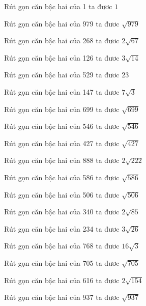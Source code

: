 \documentclass[12pt,a4paper]{article}
\begin{document}
\begin{ex}
Rút gọn căn bậc hai của 1 ta đươc $1$
\end{ex}
\begin{ex}
Rút gọn căn bậc hai của 979 ta đươc $\sqrt{979}$
\end{ex}
\begin{ex}
Rút gọn căn bậc hai của 268 ta đươc $2\sqrt{67}$
\end{ex}
\begin{ex}
Rút gọn căn bậc hai của 126 ta đươc $3\sqrt{14}$
\end{ex}
\begin{ex}
Rút gọn căn bậc hai của 529 ta đươc $23$
\end{ex}
\begin{ex}
Rút gọn căn bậc hai của 147 ta đươc $7\sqrt{3}$
\end{ex}
\begin{ex}
Rút gọn căn bậc hai của 699 ta đươc $\sqrt{699}$
\end{ex}
\begin{ex}
Rút gọn căn bậc hai của 546 ta đươc $\sqrt{546}$
\end{ex}
\begin{ex}
Rút gọn căn bậc hai của 427 ta đươc $\sqrt{427}$
\end{ex}
\begin{ex}
Rút gọn căn bậc hai của 888 ta đươc $2\sqrt{222}$
\end{ex}
\begin{ex}
Rút gọn căn bậc hai của 586 ta đươc $\sqrt{586}$
\end{ex}
\begin{ex}
Rút gọn căn bậc hai của 506 ta đươc $\sqrt{506}$
\end{ex}
\begin{ex}
Rút gọn căn bậc hai của 340 ta đươc $2\sqrt{85}$
\end{ex}
\begin{ex}
Rút gọn căn bậc hai của 234 ta đươc $3\sqrt{26}$
\end{ex}
\begin{ex}
Rút gọn căn bậc hai của 768 ta đươc $16\sqrt{3}$
\end{ex}
\begin{ex}
Rút gọn căn bậc hai của 705 ta đươc $\sqrt{705}$
\end{ex}
\begin{ex}
Rút gọn căn bậc hai của 616 ta đươc $2\sqrt{154}$
\end{ex}
\begin{ex}
Rút gọn căn bậc hai của 937 ta đươc $\sqrt{937}$
\end{ex}
\end{document}
